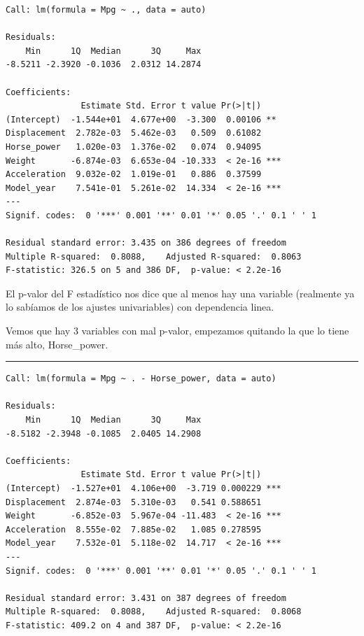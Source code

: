 \begin{verbatim}
Call: lm(formula = Mpg ~ ., data = auto)

Residuals:
    Min      1Q  Median      3Q     Max 
-8.5211 -2.3920 -0.1036  2.0312 14.2874 

Coefficients:
               Estimate Std. Error t value Pr(>|t|)    
(Intercept)  -1.544e+01  4.677e+00  -3.300  0.00106 ** 
Displacement  2.782e-03  5.462e-03   0.509  0.61082    
Horse_power   1.020e-03  1.376e-02   0.074  0.94095    
Weight       -6.874e-03  6.653e-04 -10.333  < 2e-16 ***
Acceleration  9.032e-02  1.019e-01   0.886  0.37599    
Model_year    7.541e-01  5.261e-02  14.334  < 2e-16 ***
---
Signif. codes:  0 '***' 0.001 '**' 0.01 '*' 0.05 '.' 0.1 ' ' 1

Residual standard error: 3.435 on 386 degrees of freedom
Multiple R-squared:  0.8088,    Adjusted R-squared:  0.8063 
F-statistic: 326.5 on 5 and 386 DF,  p-value: < 2.2e-16
\end{verbatim}


El p-valor del F estadístico nos dice que al menos hay una variable (realmente ya lo sabíamos de los ajustes univariables) con dependencia linea.

\vspace{\baselineskip}

Vemos que hay 3 variables con mal p-valor, empezamos quitando la que lo tiene más alto, Horse\_power.

\begin{center}\rule{\linewidth}{0.5pt}\end{center}

\begin{verbatim}
Call: lm(formula = Mpg ~ . - Horse_power, data = auto)

Residuals:
    Min      1Q  Median      3Q     Max 
-8.5182 -2.3948 -0.1085  2.0405 14.2908 

Coefficients:
               Estimate Std. Error t value Pr(>|t|)    
(Intercept)  -1.527e+01  4.106e+00  -3.719 0.000229 ***
Displacement  2.874e-03  5.310e-03   0.541 0.588651    
Weight       -6.852e-03  5.967e-04 -11.483  < 2e-16 ***
Acceleration  8.555e-02  7.885e-02   1.085 0.278595    
Model_year    7.532e-01  5.118e-02  14.717  < 2e-16 ***
---
Signif. codes:  0 '***' 0.001 '**' 0.01 '*' 0.05 '.' 0.1 ' ' 1

Residual standard error: 3.431 on 387 degrees of freedom
Multiple R-squared:  0.8088,    Adjusted R-squared:  0.8068 
F-statistic: 409.2 on 4 and 387 DF,  p-value: < 2.2e-16
\end{verbatim}

